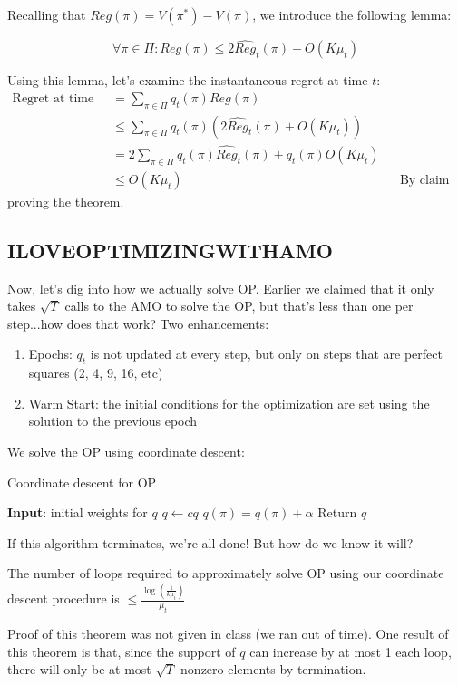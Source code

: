 \documentclass[11pt]{article}
\begin{document}
Recalling that $Reg(\pi) = V(\pi^*) - V(\pi)$, we introduce the following lemma:
\begin{lemma}
	$$\forall \pi \in \Pi: Reg(\pi) \le 2\hat{Reg}_t(\pi) + O(K \mu_t)$$
\end{lemma}

Using this lemma, let's examine the instantaneous regret at time $t$:
\begin{align*}
\text{Regret at time t} &= \sum_{\pi \in \Pi} q_t(\pi) Reg(\pi) \\
&\le \sum_{\pi \in \Pi} q_t(\pi) (2\hat{Reg}_t(\pi) + O(K \mu_t)) \\
&= 2 \sum_{\pi \in \Pi} q_t(\pi)\hat{Reg}_t(\pi) + q_t(\pi) O(K \mu_t) \\
&\le O(K \mu_t) && \text{By claim 1}
\end{align*}
proving the theorem.

\subsection{ILOVEOPTIMIZINGWITHAMO}
Now, let's dig into how we actually solve OP. Earlier we claimed that it only takes $\sqrt{T}$ calls to the AMO to solve the OP, but that's less than one per step...how does that work? Two enhancements:
\begin{enumerate}
	\item Epochs: $q_t$ is not updated at every step, but only on steps that are perfect squares (2, 4, 9, 16, etc)
	\item Warm Start: the initial conditions for the optimization are set using the solution to the previous epoch 
\end{enumerate}
We solve the OP using coordinate descent:
\begin{algorithm}
	\caption{Coordinate descent for OP}
	\begin{algorithmic}[1]
		\STATE \textbf{Input}: initial weights for $q$
		\STATE $q \gets c q$ 
		\STATE $q(\pi) = q(\pi) + \alpha$ 
		\ELSE
		\STATE Return $q$
		\ENDIF
		\ENDWHILE
	\end{algorithmic}
\end{algorithm}

If this algorithm terminates, we're all done! But how do we know it will?
\begin{theorem}
	The number of loops required to approximately solve OP using our coordinate descent procedure is $\le \frac{\log(\frac{1}{k \mu_t})}{\mu_t}$
\end{theorem}
Proof of this theorem was not given in class (we ran out of time). One result of this theorem is that, since the support of $q$ can increase by at most 1 each loop, there will only be at most $\sqrt{T}$ nonzero elements by termination.

\end{document}
